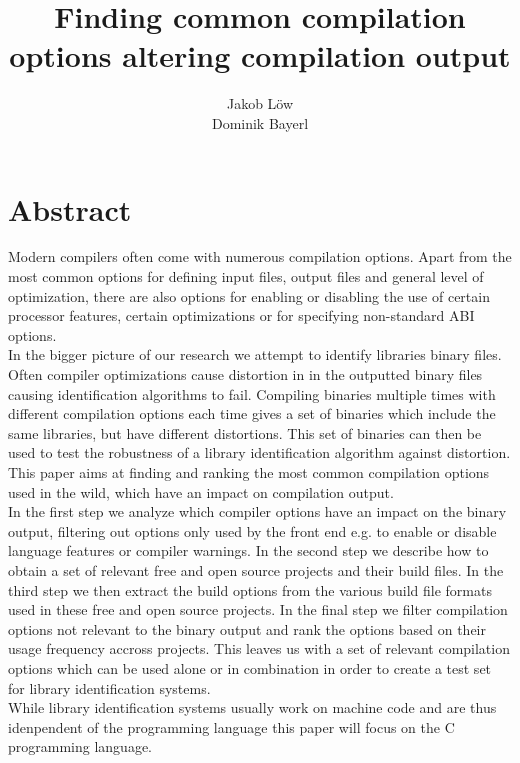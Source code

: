 \documentclass[11pt]{article}
\title{\textbf{Finding common compilation options altering compilation output}}
\author{Jakob Löw \\
	Dominik Bayerl}
\date{}
\begin{document}
\vspace{-4em}
\maketitle

\section{Abstract}
Modern compilers often come with numerous compilation options. Apart from the most common options for defining input files, output files and general level of optimization, there are also options for enabling or disabling the use of certain processor features, certain optimizations or for specifying non-standard ABI options. \\
In the bigger picture of our research we attempt to identify libraries binary files. Often compiler optimizations cause distortion in in the outputted binary files causing identification algorithms to fail. Compiling binaries multiple times with different compilation options each time gives a set of binaries which include the same libraries, but have different distortions. This set of binaries can then be used to test the robustness of a library identification algorithm against distortion. \\
This paper aims at finding and ranking the most common compilation options used in the wild, which have an impact on compilation output. \\
In the first step we analyze which compiler options have an impact on the binary output, filtering out options only used by the front end e.g. to enable or disable language features or compiler warnings. In the second step we describe how to obtain a set of relevant free and open source projects and their build files. In the third step we then extract the build options from the various build file formats used in these free and open source projects. In the final step we filter compilation options not relevant to the binary output and rank the options based on their usage frequency accross projects. This leaves us with a set of relevant compilation options which can be used alone or in combination in order to create a test set for library identification systems. \\
While library identification systems usually work on machine code and are thus idenpendent of the programming language this paper will focus on the C programming language.
\end{document}

